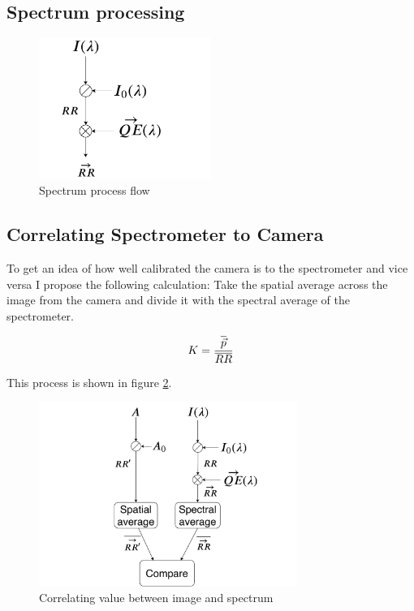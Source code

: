 \subsection{Spectrum processing}
\label{sec:spectrum_processing}

\begin{figure}[h]
    \centering
    \includegraphics[width=0.5\textwidth]{figures/thesis_program_flow.pdf}
    \caption{Spectrum process flow}
    \label{fig:spectrum_process_flow}
\end{figure}

\subsection{Correlating Spectrometer to Camera}
\label{sec:method_correlating_spectrum_to_camera}
To get an idea of how well calibrated the camera is to the spectrometer and vice versa I propose the following calculation: 
Take the spatial average across the image from the camera and divide it with the spectral average of the spectrometer. 

\begin{equation}
    \label{eq:correlating_spectrum_to_camera}
    K = \frac{\overline{\vec{p}}}{\overline{RR}}
\end{equation}

This process is shown in figure \ref{fig:correlating_spectrum_and_image}.

\begin{figure}[h]
    \centering
    \includegraphics[width=0.75\textwidth]{figures/image_comparison_with_spectrometer.pdf}
    \caption{Correlating value between image and spectrum}
    \label{fig:correlating_spectrum_and_image}
\end{figure}


